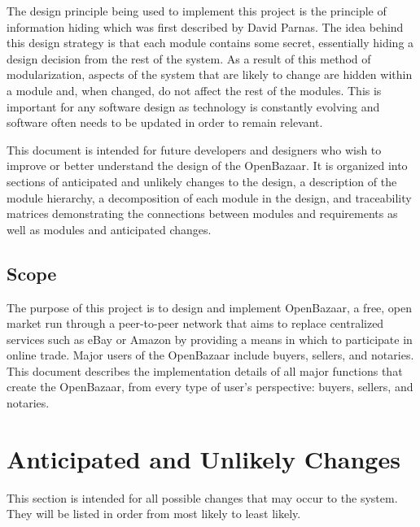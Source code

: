 \documentclass{article}
\begin{document}
The design principle being used to implement this project is the principle of information hiding which was first described by David Parnas. The idea behind this design strategy is that each module contains some secret, essentially hiding a design decision from the rest of the system. As a result of this method of modularization, aspects of the system that are likely to change are hidden within a module and, when changed, do not affect the rest of the modules. This is important for any software design as technology is constantly evolving and software often needs to be updated in order to remain relevant.

This document is intended for future developers and designers who wish to improve or better understand the design of the OpenBazaar. It is organized into sections of anticipated and unlikely changes to the design, a description of the module hierarchy, a decomposition of each module in the design, and traceability matrices demonstrating the connections between modules and requirements as well as modules and anticipated changes.

\subsection{Scope}
The purpose of this project is to design and implement OpenBazaar, a free, open market run through a peer-to-peer network that aims to replace centralized services such as eBay or Amazon by providing a means in which to participate in online trade. Major users of the OpenBazaar include buyers, sellers, and notaries. This document describes the implementation details of all major functions that create the OpenBazaar, from every type of user's perspective: buyers, sellers, and notaries.


\section*{Anticipated and Unlikely Changes}
This section is intended for all possible changes that may occur to the system. They will be listed in order from most likely to least likely.
\newline
\newline
\end{document}
